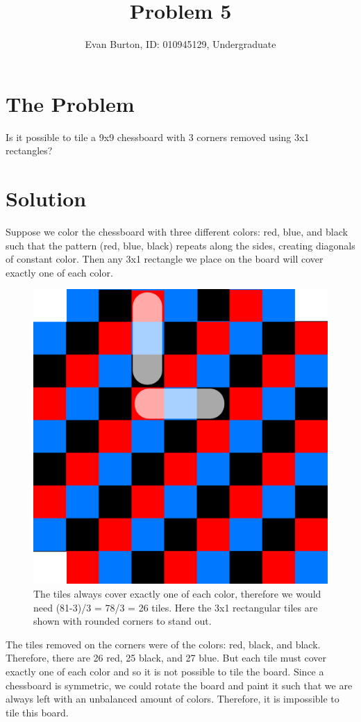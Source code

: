 \documentclass[]{article}
\title{Problem 5}
\author{Evan Burton, ID: 010945129, Undergraduate}
\begin{document}
\maketitle

\section{The Problem}
Is it possible to tile a 9x9 chessboard with 3 corners removed using 3x1 rectangles?

\section{Solution}
Suppose we color the chessboard with three different colors: red, blue, and black such that the pattern (red, blue, black) repeats along the sides, creating diagonals of constant color. Then any 3x1 rectangle we place on the board will cover exactly one of each color.

\begin{figure}[H]
\centering

\label{fig:CornersRemovedWithTrominoes}
\includegraphics[width=0.6\linewidth]{"CornersRemoved With Trominoes"}
\caption{The tiles always cover exactly one of each color, therefore we would need (81-3)/3 = 78/3 = 26 tiles. Here the 3x1 rectangular tiles are shown with rounded corners to stand out.}
\end{figure}

The tiles removed on the corners were of the colors: red, black, and black. Therefore, there are 26 red, 25 black, and 27 blue. But each tile must cover exactly one of each color and so it is not possible to tile the board. Since a chessboard is symmetric, we could rotate the board and paint it such that we are always left with an unbalanced amount of colors. Therefore, it is impossible to tile this board.
\end{document}
